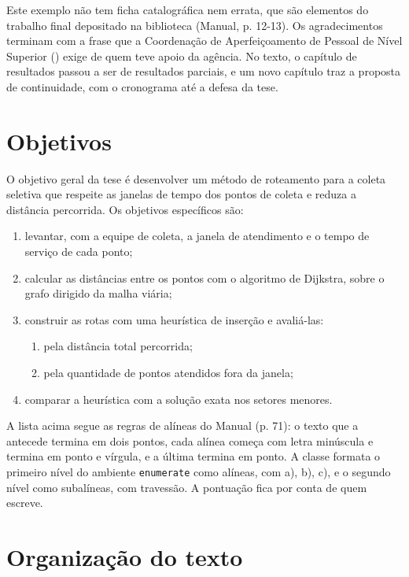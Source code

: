 \documentclass[eq,capa]{texufpel}
\begin{document}
Este exemplo não tem ficha catalográfica nem errata, que são elementos do
trabalho final depositado na biblioteca (Manual, p. 12-13). Os agradecimentos
terminam com a frase que a Coordenação de Aperfeiçoamento de Pessoal de Nível
Superior () exige de quem teve apoio da agência. No texto, o capítulo de
resultados passou a ser de resultados parciais, e um novo capítulo traz a
proposta de continuidade, com o cronograma até a defesa da tese.

\section{Objetivos}
\label{sec:objetivos}

O objetivo geral da tese é desenvolver um método de roteamento para a coleta
seletiva que respeite as janelas de tempo dos pontos de coleta e reduza a
distância percorrida. Os objetivos específicos são:

\begin{enumerate}
  \item levantar, com a equipe de coleta, a janela de atendimento e o tempo de
        serviço de cada ponto;
  \item calcular as distâncias entre os pontos com o algoritmo de Dijkstra,
        sobre o grafo dirigido da malha viária;
  \item construir as rotas com uma heurística de inserção e avaliá-las:
  \begin{enumerate}
    \item pela distância total percorrida;
    \item pela quantidade de pontos atendidos fora da janela;
  \end{enumerate}
  \item comparar a heurística com a solução exata nos setores menores.
\end{enumerate}

A lista acima segue as regras de alíneas do Manual (p. 71): o texto que a
antecede termina em dois pontos, cada alínea começa com letra minúscula e
termina em ponto e vírgula, e a última termina em ponto. A classe formata o
primeiro nível do ambiente \texttt{enumerate} como alíneas, com a), b), c), e o
segundo nível como subalíneas, com travessão. A pontuação fica por conta de
quem escreve.

\section{Organização do texto}
\end{document}
